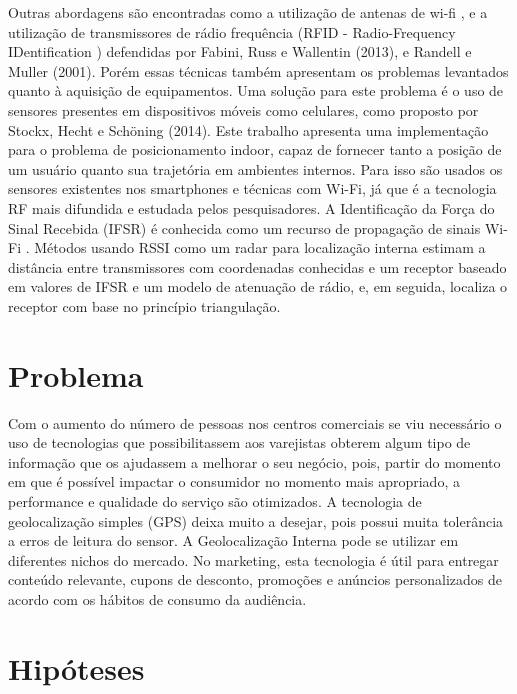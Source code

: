 Outras   abordagens   são   encontradas   como   a   utilização   de   antenas   de   wi-fi \cite{liu2007survey}, e a utilização de transmissores de rádio frequência (RFID -  Radio-Frequency IDentification ) defendidas por Fabini, Russ e Wallentin   (2013),   e   Randell   e   Muller   (2001).   Porém   essas   técnicas   também apresentam os problemas levantados quanto à aquisição de equipamentos. Uma solução para   este   problema   é   o   uso   de   sensores   presentes   em   dispositivos   móveis   como celulares, como proposto por Stockx, Hecht e Schöning (2014). Este trabalho apresenta uma implementação para o problema de posicionamento indoor,   capaz   de   fornecer   tanto   a   posição   de   um   usuário   quanto   sua   trajetória   em ambientes internos. Para isso são usados os sensores existentes nos smartphones e técnicas com Wi-Fi, já que é a tecnologia RF mais difundida e estudada pelos pesquisadores. A Identificação da Força do Sinal Recebida (IFSR) é conhecida como um recurso de propagação de sinais Wi-Fi \cite{ohara2017metric}.
Métodos usando RSSI como um radar para localização interna estimam a distância entre transmissores com coordenadas conhecidas e um receptor baseado em valores de IFSR e um modelo de atenuação de rádio, e, em seguida, localiza o receptor com base no princípio triangulação.




\section{Problema} 

Com o aumento do número de pessoas nos centros comerciais se viu necessário o uso de tecnologias que possibilitassem aos varejistas obterem algum tipo de informação que os ajudassem a melhorar o seu negócio, pois, partir do momento em que é possível impactar o consumidor no momento mais apropriado, a performance e qualidade do serviço são otimizados. A tecnologia de geolocalização simples (GPS) deixa muito a desejar, pois possui muita tolerância a erros de leitura do sensor. A Geolocalização Interna pode se utilizar em diferentes nichos do mercado. No marketing, esta tecnologia é útil para entregar conteúdo relevante, cupons de desconto, promoções e anúncios personalizados de acordo com os hábitos de consumo da audiência.

\section{Hipóteses}


